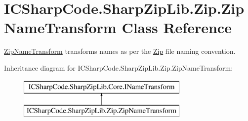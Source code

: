 \hypertarget{class_i_c_sharp_code_1_1_sharp_zip_lib_1_1_zip_1_1_zip_name_transform}{}\section{I\+C\+Sharp\+Code.\+Sharp\+Zip\+Lib.\+Zip.\+Zip\+Name\+Transform Class Reference}
\label{class_i_c_sharp_code_1_1_sharp_zip_lib_1_1_zip_1_1_zip_name_transform}


\hyperlink{class_i_c_sharp_code_1_1_sharp_zip_lib_1_1_zip_1_1_zip_name_transform}{Zip\+Name\+Transform} transforms names as per the \hyperlink{namespace_i_c_sharp_code_1_1_sharp_zip_lib_1_1_zip}{Zip} file naming convention.  


Inheritance diagram for I\+C\+Sharp\+Code.\+Sharp\+Zip\+Lib.\+Zip.\+Zip\+Name\+Transform\+:\begin{figure}[H]
\begin{center}
\leavevmode
\includegraphics[height=2.000000cm]{class_i_c_sharp_code_1_1_sharp_zip_lib_1_1_zip_1_1_zip_name_transform}
\end{center}
\end{figure}
